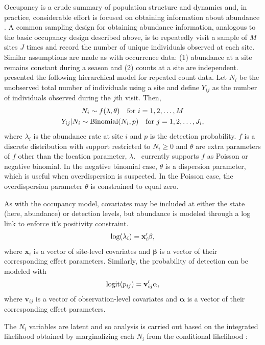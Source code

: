 \documentclass[article,shortnames]{jss}
\DeclareMathOperator{\logit}{logit}
\DeclareMathOperator{\Bin}{Binomial}
\newcommand{\um}{\pkg{unmarked}}
\begin{document}
Occupancy is a crude summary of population structure and dynamics and, in 
practice, considerable effort is focused on obtaining information about 
abundance \citep{dorazio07}. A common sampling design for obtaining 
abundance information, 
analogous to the basic occupancy design described above, is to 
repeatedly visit a sample of $M$ sites $J$ times and
record the number of unique individuals observed at each site.
Similar assumptions are made as with occurrence data: (1) abundance at
a site remains constant during a season and (2) counts at a site are
independent.  \citet{Royle2004} presented the following hierarchical model for
repeated count data.  Let $N_i$ be the unobserved total number of
individuals using a site and define $Y_{ij}$ as the number of individuals 
observed during the $j$th visit.  Then,
\begin{gather}
\label{eq:pc2}
  N_i \sim f(\lambda, \theta) \text{\quad for $i=1,2,\dots,M$}  \notag\\
  Y_{ij}|N_{i} \sim \Bin(N_i, p)\text{\quad for $j=1,2,\dots,J_{i}$} \notag,
\end{gather}
where $\lambda_i$ is the abundance rate at site $i$ and $p$ is
the detection probability.  $f$ is
a discrete distribution with support restricted to $N_{i} \ge 0$ and
$\theta$ are extra parameters of $f$ other than the location
parameter, $\lambda$.  \um\ currently supports $f$ as Poisson or
negative binomial.  In the
negative binomial case, $\theta$ is a dispersion parameter, which is
useful when overdispersion is suspected. In the Poisson case, 
the overdispersion parameter $\theta$ is constrained to equal zero.  

As with the occupancy model, covariates may be included at either the
state (here, abundance) or detection levels, but abundance is modeled
through a log link to enforce it's positivity constraint.
\begin{gather}
  \log(\lambda_i) = \mathbf x_i' \mathbf \beta, \notag
\end{gather}
where $\mathbf x_i$ is a vector of site-level covariates and $\mathbf \beta$
is a vector of their corresponding effect parameters.  Similarly, the
probability of detection can be modeled with
\begin{gather}
  \logit(p_{ij}) = \mathbf v_{ij}' \mathbf \alpha, \notag
\end{gather}
where $\mathbf v_{ij}$ is a vector of observation-level covariates and
$\mathbf \alpha$ is a vector of their corresponding effect parameters.

The $N_{i}$ variables are latent and so analysis is carried out based on 
the integrated likelihood obtained by marginalizing each $N_{i}$ from the 
conditional likelihood \citep{Royle2004b}:
\end{document}
